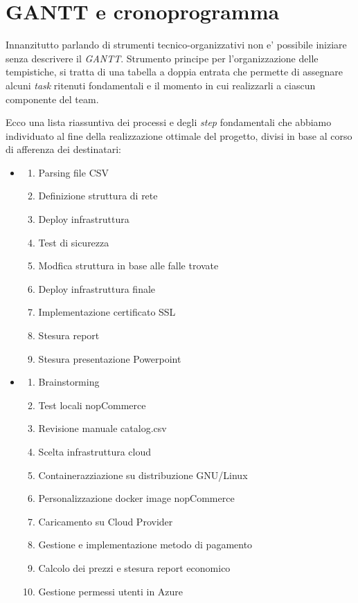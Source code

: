 \documentclass[a4paper]{report}
\begin{document}
	\section{GANTT e cronoprogramma}\label{gantt_e_cronoprogramma}
		Innanzitutto parlando di strumenti tecnico-organizzativi non e' possibile iniziare senza descrivere il
		\emph{GANTT}.  Strumento principe per l'organizzazione delle tempistiche, si tratta di una tabella a doppia
		entrata che permette di assegnare alcuni \emph{task} ritenuti fondamentali e il momento in cui realizzarli a
		ciascun componente del team.

		Ecco una lista riassuntiva dei processi e degli \emph{step} fondamentali che abbiamo individuato al fine della
		realizzazione ottimale del progetto, divisi in base al corso di afferenza dei destinatari:
		\begin{itemize}
			\item \begin{enumerate}
					\item Parsing file CSV
					\item Definizione struttura di rete
					\item Deploy infrastruttura
					\item Test di sicurezza
					\item Modfica struttura in base alle falle trovate
					\item Deploy infrastruttura finale
					\item Implementazione certificato SSL
					\item Stesura report
					\item Stesura presentazione Powerpoint
				\end{enumerate}
			\item \begin{enumerate}
					\item Brainstorming
					\item Test locali nopCommerce
					\item Revisione manuale catalog.csv
					\item Scelta infrastruttura cloud
					\item Containerazziazione su distribuzione GNU/Linux
					\item Personalizzazione docker image nopCommerce
					\item Caricamento su Cloud Provider
					\item Gestione e implementazione metodo di pagamento
					\item Calcolo dei prezzi e stesura report economico
					\item Gestione permessi utenti in Azure
				\end{enumerate}
		\end{itemize}
\end{document}
